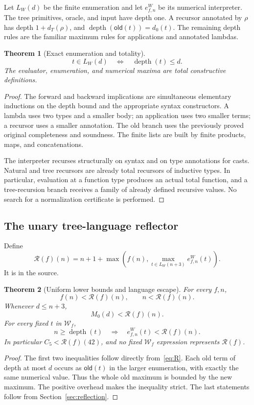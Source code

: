 \documentclass[11pt,a4paper]{article}
\newtheorem{theorem}{Theorem}[section]
\theoremstyle{definition}
\newcommand{\dep}{\operatorname{depth}}
\newcommand{\R}{\mathcal R}
\newcommand{\code}[1]{\texttt{\detokenize{#1}}}
\begin{document}
Let \(L_W(d)\) be the finite enumeration and let \(e^W_{f,n}\) be its
numerical interpreter. The tree primitives, oracle, and input have depth
one. A recursor annotated by \(\rho\) has depth \(1+d_T(\rho)\), and
\(\dep(\mathsf{old}(t))=d_0(t)\). The remaining depth rules are the familiar
maximum rules for applications and annotated lambdas.

\begin{theorem}[Exact enumeration and totality]
\[
             t\in L_W(d)\quad\Longleftrightarrow\quad\dep(t)\le d.
\]
The evaluator, enumeration, and numerical maxima are total constructive
definitions.
\end{theorem}
\begin{proof}
The forward and backward implications are simultaneous elementary inductions
on the depth bound and the appropriate syntax constructors. A lambda uses
two types and a smaller body; an application uses two smaller terms; a
recursor uses a smaller annotation. The old branch uses the previously
proved original completeness and soundness. The finite lists are built by
finite products, maps, and concatenations.

The interpreter recurses structurally on syntax and on type annotations for
casts. Natural and tree recursors are already total recursors of inductive
types. In particular, evaluation at a function type produces an actual total
function, and a tree-recursion branch receives a family of already defined
recursive values. No search for a normalization certificate is performed.
\end{proof}

\subsection{The unary tree-language reflector}

Define
\begin{equation}
 \R(f)(n)=n+1+\max\left(f(n),\max_{t\in L_W(n+3)}e^W_{f,n}(t)\right).
 \label{eq:R}
\end{equation}
It is \code{Arboreal.Rw} in the source.

\begin{theorem}[Uniform lower bounds and language escape]
For every \(f,n\),
\[
 f(n)<\R(f)(n),\qquad n<\R(f)(n).
\]
Whenever \(d\le n+3\),
\[
 M_0(d)<\R(f)(n).
\]
For every fixed \(t\) in \(\mathcal W_f\),
\[
 n\ge\dep(t)\quad\Longrightarrow\quad
 e^W_{f,n}(t)<\R(f)(n).
\]
In particular \(C_5<\R(f)(42)\), and no fixed \(\mathcal W_f\) expression
represents \(\R(f)\).
\end{theorem}
\begin{proof}
The first two inequalities follow directly from~\eqref{eq:R}. Each old term
of depth at most \(d\) occurs as \(\mathsf{old}(t)\) in the larger enumeration,
with exactly the same numerical value. Thus the whole old maximum is bounded
by the new maximum. The positive overhead makes the inequality strict. The
last statements follow from Section~\ref{sec:reflection}.
\end{proof}
\end{document}

